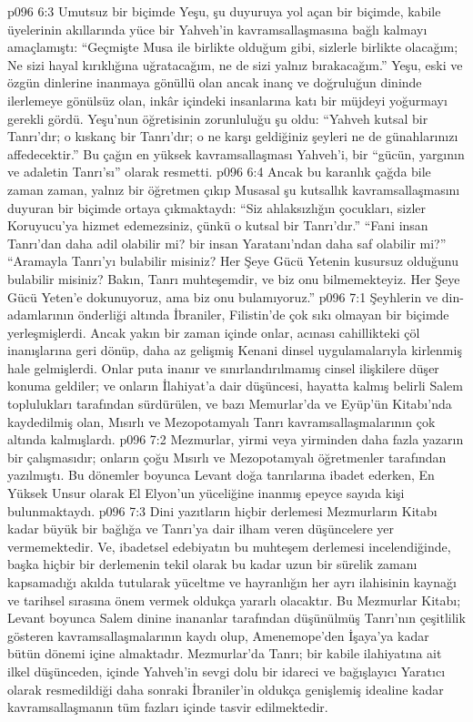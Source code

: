 \vs p096 6:3 Umutsuz bir biçimde Yeşu, şu duyuruya yol açan bir biçimde, kabile üyelerinin akıllarında yüce bir Yahveh’in kavramsallaşmasına bağlı kalmayı amaçlamıştı: “Geçmişte Musa ile birlikte olduğum gibi, sizlerle birlikte olacağım; Ne sizi hayal kırıklığına uğratacağım, ne de sizi yalnız bırakacağım.” Yeşu, eski ve özgün dinlerine inanmaya gönüllü olan ancak inanç ve doğruluğun dininde ilerlemeye gönülsüz olan, inkâr içindeki insanlarına katı bir müjdeyi yoğurmayı gerekli gördü. Yeşu’nun öğretisinin zorunluluğu şu oldu: “Yahveh kutsal bir Tanrı’dır; o kıskanç bir Tanrı’dır; o ne karşı geldiğiniz şeyleri ne de günahlarınızı affedecektir.” Bu çağın en yüksek kavramsallaşması Yahveh’i, bir “gücün, yargının ve adaletin Tanrı’sı” olarak resmetti.
\vs p096 6:4 Ancak bu karanlık çağda bile zaman zaman, yalnız bir öğretmen çıkıp Musasal şu kutsallık kavramsallaşmasını duyuran bir biçimde ortaya çıkmaktaydı: “Siz ahlaksızlığın çocukları, sizler Koruyucu’ya hizmet edemezsiniz, çünkü o kutsal bir Tanrı’dır.” “Fani insan Tanrı’dan daha adil olabilir mi? bir insan Yaratanı’ndan daha saf olabilir mi?” “Aramayla Tanrı’yı bulabilir misiniz? Her Şeye Gücü Yetenin kusursuz olduğunu bulabilir misiniz? Bakın, Tanrı muhteşemdir, ve biz onu bilmemekteyiz. Her Şeye Gücü Yeten’e dokunuyoruz, ama biz onu bulamıyoruz.”
\vs p096 7:1 Şeyhlerin ve din\hyp{}adamlarının önderliği altında İbraniler, Filistin’de çok sıkı olmayan bir biçimde yerleşmişlerdi. Ancak yakın bir zaman içinde onlar, acınası cahillikteki çöl inanışlarına geri dönüp, daha az gelişmiş Kenani dinsel uygulamalarıyla kirlenmiş hale gelmişlerdi. Onlar puta inanır ve sınırlandırılmamış cinsel ilişkilere düşer konuma geldiler; ve onların İlahiyat’a dair düşüncesi, hayatta kalmış belirli Salem toplulukları tarafından sürdürülen, ve bazı Memurlar’da ve Eyüp’ün Kitabı’nda kaydedilmiş olan, Mısırlı ve Mezopotamyalı Tanrı kavramsallaşmalarının çok altında kalmışlardı.
\vs p096 7:2 Mezmurlar, yirmi veya yirminden daha fazla yazarın bir çalışmasıdır; onların çoğu Mısırlı ve Mezopotamyalı öğretmenler tarafından yazılmıştı. Bu dönemler boyunca Levant doğa tanrılarına ibadet ederken, En Yüksek Unsur olarak El Elyon’un yüceliğine inanmış epeyce sayıda kişi bulunmaktaydı.
\vs p096 7:3 Dini yazıtların hiçbir derlemesi Mezmurların Kitabı kadar büyük bir bağlığa ve Tanrı’ya dair ilham veren düşüncelere yer vermemektedir. Ve, ibadetsel edebiyatın bu muhteşem derlemesi incelendiğinde, başka hiçbir bir derlemenin tekil olarak bu kadar uzun bir sürelik zamanı kapsamadığı akılda tutularak yüceltme ve hayranlığın her ayrı ilahisinin kaynağı ve tarihsel sırasına önem vermek oldukça yararlı olacaktır. Bu Mezmurlar Kitabı; Levant boyunca Salem dinine inananlar tarafından düşünülmüş Tanrı’nın çeşitlilik gösteren kavramsallaşmalarının kaydı olup, Amenemope’den İşaya’ya kadar bütün dönemi içine almaktadır. Mezmurlar’da Tanrı; bir kabile ilahiyatına ait ilkel düşünceden, içinde Yahveh’in sevgi dolu bir idareci ve bağışlayıcı Yaratıcı olarak resmedildiği daha sonraki İbraniler’in oldukça genişlemiş idealine kadar kavramsallaşmanın tüm fazları içinde tasvir edilmektedir.
